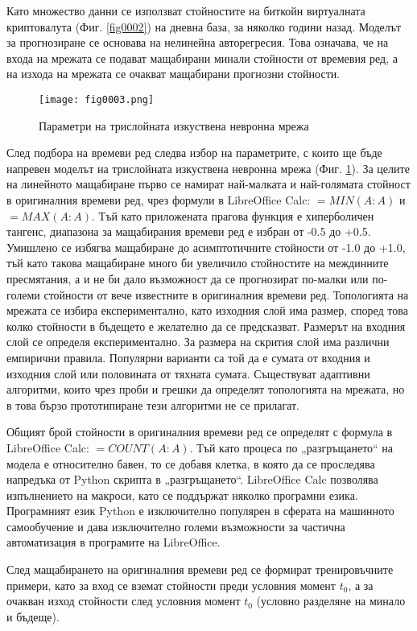 Като множество данни се използват стойностите на биткойн виртуалната криптовалута (Фиг. \ref{fig0002}) на дневна база, за няколко години назад. Моделът за прогнозиране се основава на нелинейна авторегресия. Това означава, че на входа на мрежата се подават мащабирани минали стойности от времевия ред, а на изхода на мрежата се очакват мащабирани прогнозни стойности. 

\begin{figure}[H]
  \centering
  \texttt{[image: fig0003.png]}
  \caption{Параметри на трислойната изкуствена невронна мрежа}
\label{fig0003}
\end{figure}

След подбора на времеви ред следва избор на параметрите, с които ще бъде напревен моделът на трислойната изкуствена невронна мрежа (Фиг. \ref{fig0003}). За целите на линейното мащабиране първо се намират най-малката и най-голямата стойност в оригиналния времеви ред, чрез формули в LibreOffice Calc: $=MIN(A:A)$ и $=MAX(A:A)$. Тъй като приложената прагова функция е хиперболичен тангенс, диапазона за мащабирания времеви ред е избран от -0.5 до +0.5. Умишлено се избягва мащабиране до асимптотичните стойности от -1.0 до +1.0, тъй като такова мащабиране много би увеличило стойностите на междинните пресмятания, а и не би дало възможност да се прогнозират по-малки или по-големи стойности от вече известните в оригиналния времеви ред. Топологията на мрежата се избира експериментално, като изходния слой има размер, според това колко стойности в бъдещето е желателно да се предсказват. Размерът на входния слой се определя експериментално. За размера на скрития слой има различни емпирични правила. Популярни варианти са той да е сумата от входния и изходния слой или половината от тяхната сумата. Съществуват адаптивни алгоритми, които чрез проби и грешки да определят топологията на мрежата, но в това бързо прототипиране тези алгоритми не се прилагат. 

Общият брой стойности в оригиналния времеви ред се определят с формула в LibreOffice Calc: $=COUNT(A:A)$. Тъй като процеса по „разгръщането“ на модела е относително бавен, то се добавя клетка, в която да се проследява напредъка от Python скрипта в „разгръщането“. LibreOffice Calc позволява изпълнението на макроси, като се поддържат няколко програмни езика. Програмният език Python е изключително популярен в сферата на машинното самообучение и дава изключително големи възможности за частична автоматизация в програмите на LibreOffice.

След мащабирането на оригиналния времеви ред се формират тренировъчните примери, като за вход се вземат стойности преди условния момент $t_0$, а за очакван изход стойности след условния момент $t_0$ (условно разделяне на минало и бъдеще).

